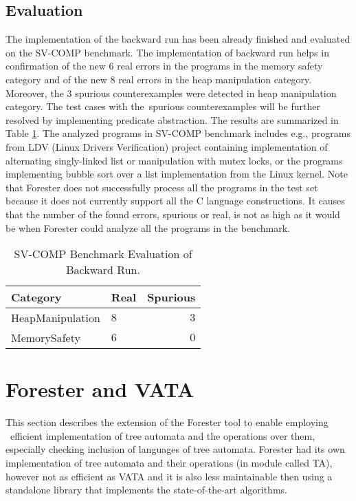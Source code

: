 \documentclass[fleqn,11pt]{ExcelAtFIT} %
\begin{document}
\subsection{Evaluation}

The implementation of the backward run has been already finished and evaluated on the SV-COMP benchmark.
The implementation of backward run helps in confirmation of the new $6$ real errors in the programs in the memory safety category and
of the new $8$ real errors in the heap manipulation category.
Moreover, the $3$ spurious counterexamples were detected in heap manipulation category.
The test cases with the~spurious counterexamples will be further resolved by implementing predicate
abstraction.
The results are summarized in Table \ref{tab:bwres}.
The analyzed programs in SV-COMP benchmark includes e.g., programs from LDV (Linux Drivers Verification) project
containing implementation of alternating singly-linked list or manipulation with mutex locks, or the programs
implementing bubble sort over a list implementation from the Linux kernel.
Note that Forester does not successfully process all the programs in the test set
because it does not currently support all the C language constructions.
It causes that the number of the found errors, spurious or real, is not as high as it would be when
Forester could analyze all the programs in the benchmark.

\begin{table}[bu]
	\vskip6pt
	\caption{SV-COMP Benchmark Evaluation of Backward Run.%
	}
	\centering
	\begin{tabular}{llr}
		\toprule
		Category & Real & Spurious \\
		\midrule
		HeapManipulation & $8$ & $3$ \\
		MemorySafety & $6$ & $0$ \\
		\bottomrule
	\end{tabular}
	\label{tab:bwres}
\end{table}


\section{Forester and VATA}
\label{sec:forvata}

This section describes the extension of the Forester tool to enable employing \vata\ 
efficient implementation of	tree automata and the operations over them,
especially checking inclusion of languages of tree automata.
Forester had its own implementation of tree automata and their operations (in module called TA),
however not as efficient as VATA and it is also less maintainable
then using a standalone library that implements the state-of-the-art algorithms.
\end{document}
